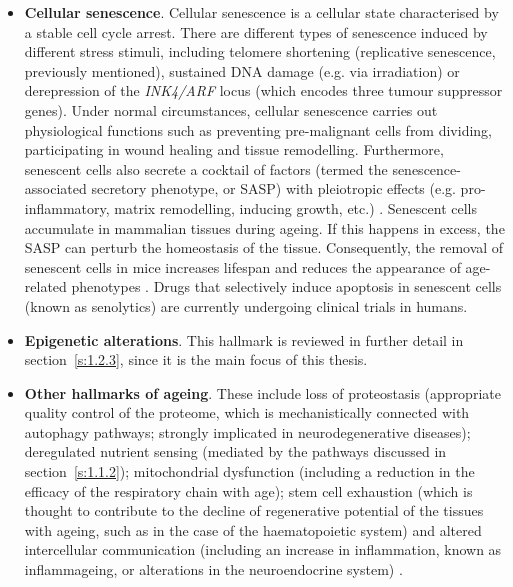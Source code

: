\begin{itemize}
	\item \textbf{Cellular senescence}. Cellular senescence is a cellular state characterised by a stable cell cycle arrest. There are different types of senescence induced by different stress stimuli, including telomere shortening (replicative senescence, previously mentioned), sustained DNA damage (e.g. via irradiation) or derepression of the \textit{INK4/ARF} locus (which encodes three tumour suppressor genes)\cite{Lopez-Otin2013,Herranz2018}. Under normal circumstances, cellular senescence carries out physiological functions such as preventing pre-malignant cells from dividing, participating in wound healing and tissue remodelling. Furthermore, senescent cells also secrete a cocktail of factors (termed the senescence-associated secretory phenotype, or \acrshort{SASP}) with pleiotropic effects (e.g. pro-inflammatory, matrix remodelling, inducing growth, etc.) \cite{Herranz2018}. Senescent cells accumulate in mammalian tissues during ageing. If this happens in excess, the SASP can perturb the homeostasis of the tissue. Consequently, the removal of senescent cells in mice increases lifespan and reduces the appearance of age-related phenotypes \cite{Baker2011,Baker2016,Xu2018}. Drugs that selectively induce apoptosis in senescent cells (known as senolytics) \cite{Kirkland2017} are currently undergoing clinical trials in humans. 
	
	\item \textbf{Epigenetic alterations}. This hallmark is reviewed in further detail in section~\ref{s:1.2.3}, since it is the main focus of this thesis.
	
	\item \textbf{Other hallmarks of ageing}. These include loss of proteostasis (appropriate quality control of the proteome, which is mechanistically connected with autophagy pathways; strongly implicated in neurodegenerative diseases); deregulated nutrient sensing (mediated by the pathways discussed in section~\ref{s:1.1.2}); mitochondrial dysfunction (including a reduction in the efficacy of the respiratory chain with age); stem cell exhaustion (which is thought to contribute to the decline of regenerative potential of the tissues with ageing, such as in the case of the haematopoietic system) and altered intercellular communication (including an increase in inflammation, known as inflammageing, or alterations in the neuroendocrine system) \cite{Lopez-Otin2013}.

	
\end{itemize}

